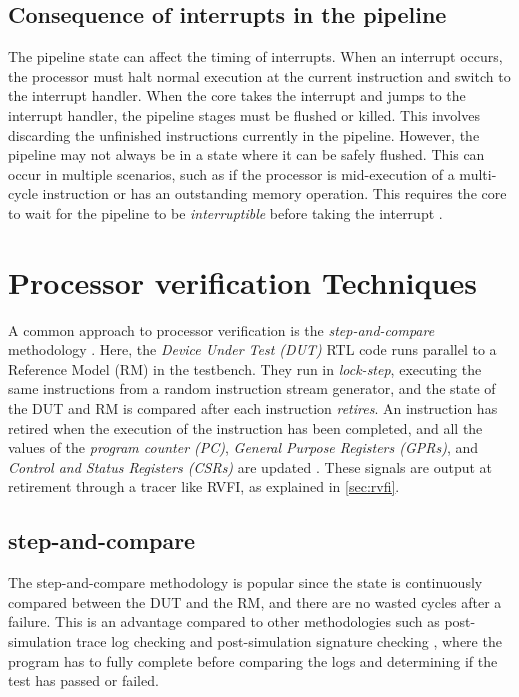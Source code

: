 \subsection{Consequence of interrupts in the pipeline}

The pipeline state can affect the timing of interrupts. When an interrupt occurs, the processor must halt normal execution at the current instruction and switch to the interrupt handler. When the core takes the interrupt and jumps to the interrupt handler, the pipeline stages must be flushed or killed. This involves discarding the unfinished instructions currently in the pipeline. However, the pipeline may not always be in a state where it can be safely flushed. This can occur in multiple scenarios, such as if the processor is mid-execution of a multi-cycle instruction or has an outstanding memory operation. This requires the core to wait for the pipeline to be \textit{interruptible} before taking the interrupt \cite{taylorAdvancedRISCVVerification2023}.

\section{Processor verification Techniques}
\label{sec:bg_verificationTech}


A common approach to processor verification is the \textit{step-and-compare} methodology \cite{taylorAdvancedRISCVVerification2023}. Here, the \textit{Device Under Test (DUT)} RTL code runs parallel to a Reference Model (RM) in the testbench. They run in \textit{lock-step}, executing the same instructions from a random instruction stream generator, and the state of the DUT and RM is compared after each instruction \textit{retires}. An instruction has retired when the execution of the instruction has been completed, and all the values of the \textit{program counter (PC)}, \textit{General Purpose Registers (GPRs)}, and \textit{Control and Status Registers (CSRs)} are updated \cite{taylorAdvancedRISCVVerification2023}. These signals are output at retirement through a tracer like RVFI, as explained in \cref{sec:rvfi}.

\subsection{step-and-compare}
\label{sec:step-and-compare}
The step-and-compare methodology is popular since the state is continuously compared between the DUT and the RM, and there are no wasted cycles after a failure. This is an advantage compared to other methodologies such as post-simulation trace log checking and post-simulation signature checking \cite{duncangrahamRISCVVerificationImplications2023}, where the program has to fully complete before comparing the logs and determining if the test has passed or failed.


